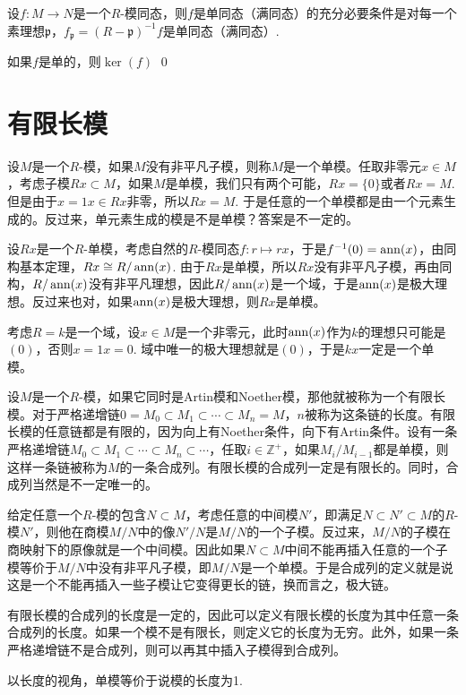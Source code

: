 \pro 设$f:M\to N$是一个$R$-模同态，则$f$是单同态（满同态）的充分必要条件是对每一个素理想$\mathfrak{p}$，$f_{\mathfrak{p}}=(R-\mathfrak{p})^{-1}f$是单同态（满同态）.

\proof
	如果$f$是单的，则$\ker(f)$
\qed

\section{有限长模}

\para 设$M$是一个$R$-模，如果$M$没有非平凡子模，则称$M$是一个单模。任取非零元$x\in M$，考虑子模$Rx\subset M$，如果$M$是单模，我们只有两个可能，$Rx=\{0\}$或者$Rx=M$. 但是由于$x=1x\in Rx$非零，所以$Rx=M$. 于是任意的一个单模都是由一个元素生成的。反过来，单元素生成的模是不是单模？答案是不一定的。

设$Rx$是一个$R$-单模，考虑自然的$R$-模同态$f:r\mapsto rx$，于是$f^{-1}(0)=\operatorname{ann}(x)$，由同构基本定理，$Rx\cong R/\operatorname{ann}(x)$. 由于$Rx$是单模，所以$Rx$没有非平凡子模，再由同构，$R/\operatorname{ann}(x)$没有非平凡理想，因此$R/\operatorname{ann}(x)$是一个域，于是$\operatorname{ann}(x)$是极大理想。反过来也对，如果$\operatorname{ann}(x)$是极大理想，则$Rx$是单模。

考虑$R=k$是一个域，设$x\in M$是一个非零元，此时$\operatorname{ann}(x)$作为$k$的理想只可能是$(0)$，否则$x=1x=0$. 域中唯一的极大理想就是$(0)$，于是$kx$一定是一个单模。

\para 设$M$是一个$R$-模，如果它同时是Artin模和Noether模，那他就被称为一个有限长模。对于严格递增链$0=M_0\subset M_1\subset \cdots\subset M_n=M$，$n$被称为这条链的长度。有限长模的任意链都是有限的，因为向上有Noether条件，向下有Artin条件。设有一条严格递增链$M_0\subset M_1\subset \cdots\subset M_n \subset \cdots $，任取$i\in \mathbb{Z}^+$，如果$M_{i}/M_{i-1}$都是单模，则这样一条链被称为$M$的一条合成列。有限长模的合成列一定是有限长的。同时，合成列当然是不一定唯一的。

给定任意一个$R$-模的包含$N\subset M$，考虑任意的中间模$N'$，即满足$N\subset N'\subset M$的$R$-模$N'$，则他在商模$M/N$中的像$N'/N$是$M/N$的一个子模。反过来，$M/N$的子模在商映射下的原像就是一个中间模。因此如果$N\subset M$中间不能再插入任意的一个子模等价于$M/N$中没有非平凡子模，即$M/N$是一个单模。于是合成列的定义就是说这是一个不能再插入一些子模让它变得更长的链，换而言之，极大链。

\pro 有限长模的合成列的长度是一定的，因此可以定义有限长模的长度为其中任意一条合成列的长度。如果一个模不是有限长，则定义它的长度为无穷。此外，如果一条严格递增链不是合成列，则可以再其中插入子模得到合成列。

以长度的视角，单模等价于说模的长度为1.

